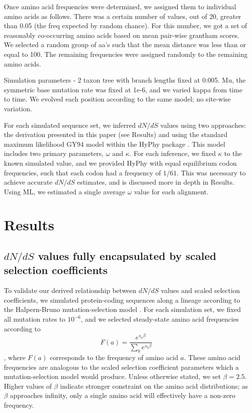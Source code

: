 \documentclass[11pt]{article}
\begin{document}
Once amino acid frequencies were determined, we assigned them to individual amino acids as follows. There was a certain number of values, out of 20, greater than 0.05 (the freq expected by random chance). For this number, we got a set of reasonably co-occurring amino acids based on mean pair-wise grantham scores. We selected a random group of aa's such that the mean distance was less than or equal to 100. The remaining frequencies were assigned randomly to the remaining amino acids.

Simulation parameters - 2 taxon tree with branch lengths fixed at 0.005. Mu, the symmetric base mutation rate was fixed at 1e-6, and we varied kappa from time to time. We evolved each position according to the same model; no site-wise variation.

For each simulated sequence set, we inferred $dN/dS$ values using two approaches: the derivation presented in this paper (see Results) and using the standard maximum likelihood GY94 model \cite{GoldmanYang1994} within the HyPhy package \cite{KosakovskyPondetal2005}. This model includes two primary parameters, $\omega$ and $\kappa$. For each inference, we fixed $\kappa$ to the known simulated value, and we provided HyPhy with equal equilibrium codon frequencies, such that each codon had a frequency of $1/61$. This was necessary to achieve accurate $dN/dS$ estimates, and is discussed more in depth in Results. Using ML, we estimated a single average $\omega$ value for each alignment. 



\section*{Results}

\subsection*{$dN/dS$ values fully encapsulated by scaled selection coefficients}

To validate our derived relationship between $dN/dS$ values and scaled selection coefficients, we simulated protein-coding sequences along a lineage according to the Halpern-Bruno mutation-selection model \cite{HalpernBruno1998}. For each simulation set, we fixed all mutation rates to $10^{-6}$, and we selected steady-state amino acid frequencies according to \begin{equation} F(a) = \frac{e^{s_a\beta}}{\sum_b e^{s_b\beta}} \end{equation}, where $F(a)$ corresponds to the frequency of amino acid $a$. These amino acid frequencies are analogous to the scaled selection coefficient parameters which a mutation-selection model would produce. Unless otherwise stated, we set $\beta = 2.5$. Higher values of $\beta$ indicate stronger constraint on the amino acid distributions; as $\beta$ approaches infinity, only a single amino acid will effectively have a non-zero frequency. 
\end{document}
